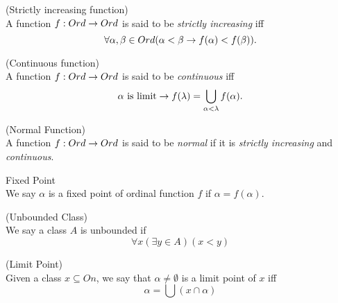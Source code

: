 
\begin{definition}{(Strictly increasing function)}\label{def:increasing_function}\\
A function $f: Ord \rightarrow Ord$ is said to be \emph{strictly increasing} iff
\begin{equation}
\forall \alpha, \beta \in Ord (\alpha < \beta \rightarrow f(\alpha) < f(\beta)).
\end{equation}
\end{definition}

\begin{definition}{(Continuous function)}\label{def:continuous_function}\\
A function $f: Ord \rightarrow Ord$ is said to be \emph{continuous} iff
\begin{equation}
\alpha\mbox{ is limit} \rightarrow f(\lambda) = \bigcup_{\alpha < \lambda} f(\alpha).
\end{equation}
\end{definition}

\begin{definition}{(Normal Function)}\label{def:normal_function}\\
A function $f: Ord \rightarrow Ord$ is said to be \emph{normal} if it is \emph{strictly increasing} and \emph{continuous}.
\end{definition}

\begin{definition}{Fixed Point}\label{def:fixed_point}\\
We say $\alpha$ is a fixed point of ordinal function $f$ if $\alpha=f(\alpha)$.
\end{definition}

\begin{definition}{(Unbounded Class)}\label{def:unbounded_class}\\
We say a class $A$ is unbounded if 
\begin{equation}
\forall x (\exists y \in A) (x < y)
\end{equation}
\end{definition}

\begin{definition}{(Limit Point)}\label{def:limit_point}\\
Given a class $x \subseteq On$, we say that $\alpha \neq \emptyset$ is a limit point of $x$ iff 
\begin{equation}
\alpha = \bigcup(x \cap \alpha)
\end{equation}
\end{definition}

